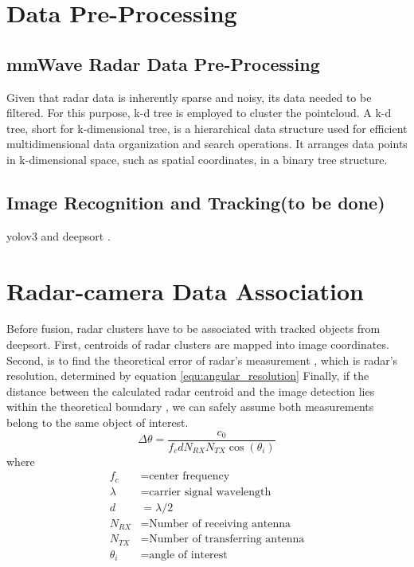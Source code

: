 \section{Data Pre-Processing}\label{sec:2-preprocessing}
\subsection{mmWave Radar Data Pre-Processing}\label{sec:2-kd_tree}
Given that radar data is inherently sparse and noisy, its data needed to be filtered.
For this purpose, k-d tree is employed to cluster the pointcloud.
A k-d tree, short for k-dimensional tree, is a hierarchical data structure used for efficient multidimensional data organization and search operations. 
It arranges data points in k-dimensional space, such as spatial coordinates, in a binary tree structure. 

\subsection{Image Recognition and Tracking\small(to be done)}\label{sec:2-img_recognition}
yolov3 \cite{redmon2018yolov3} and deepsort \cite{Wojke2017simple}.

\section{Radar-camera Data Association}\label{sec:2-association}
Before fusion, radar clusters have to be associated with tracked objects from deepsort.
First, centroids of radar clusters are mapped into image coordinates.
Second, is to find the theoretical error of radar's measurement \cite{8844649}, which is radar's resolution, determined by equation \ref*{equ:angular_resolution}
Finally, if the distance between the calculated radar centroid and the image detection lies within the theoretical boundary
, we can safely assume both measurements belong to the same object of interest.
\begin{equation}\label{equ:angular_resolution}
    \Delta \theta= \frac{c_0}{f_c d N_{RX} N_{TX} \cos(\theta _i)}
\end{equation}
where
\begin{align*}
    f_c & = \text{center frequency} \\
    \lambda & = \text{carrier signal wavelength} \\
    d & =  \lambda/2 \\
    N_{RX} & = \text{Number of receiving antenna}\\
    N_{TX}& = \text{Number of transferring antenna}\\
    \theta _i &= \text{angle of interest}
\end{align*}

